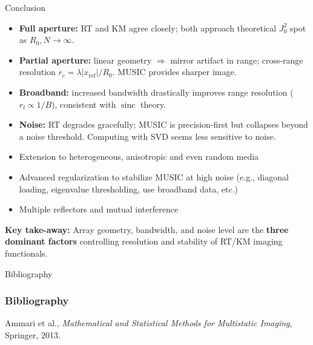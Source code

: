 \documentclass{beamer}
\begin{document}
\begin{frame}{Conclusion}
  \scriptsize
  \vspace{-0.1cm}
  \begin{tcolorbox}[keybox, title=Summary of Findings, top=2pt, bottom=2pt]
    \begin{itemize}[leftmargin=0.5em, label=\textbullet]\setlength\itemsep{1.5pt}
      \item \textbf{Full aperture:} RT and KM agree closely; both approach theoretical $J_0^2$ spot as $R_0,N\!\to\!\infty$.
      \item \textbf{Partial aperture:} linear geometry $\Rightarrow$ mirror artifact in range; cross-range resolution $r_c\!=\!\lambda|x_{\mathrm{ref}}|/R_0$. MUSIC provides sharper image.
      \item \textbf{Broadband:} increased bandwidth drastically improves range resolution ($r_l \!\propto\! 1/B$), consistent with $\operatorname{sinc}$ theory.
      \item \textbf{Noise:} RT degrades gracefully; MUSIC is precision-first but collapses beyond a noise threshold. Computing with SVD seems less sensitive to noise.
    \end{itemize}
  \end{tcolorbox}


  \begin{tcolorbox}[warnbox, title=Perspectives, top=2pt, bottom=2pt]
    \begin{itemize}[leftmargin=0.5em, label=\textbullet]\setlength\itemsep{1.5pt}
      \item Extension to heterogeneous, anisotropic and even random media
      \item Advanced regularization to stabilize MUSIC at high noise (e.g., diagonal loading, eigenvalue thresholding, use broadband data, etc.)
      \item Multiple reflectors and mutual interference
    \end{itemize}
  \end{tcolorbox}


  \begin{tcolorbox}[keybox, top=2pt, bottom=2pt]
    \textbf{Key take-away:} Array geometry, bandwidth, and noise level are the \textbf{three dominant factors} controlling resolution and stability of RT/KM imaging functionals.
  \end{tcolorbox}
\end{frame}


\begingroup
{}

\begin{frame}[allowframebreaks]{Bibliography}
\frametitle{Bibliography}
Ammari et al., \textit{Mathematical and Statistical Methods for Multistatic Imaging}, Springer, 2013.
\end{frame}
\endgroup
\end{document}
